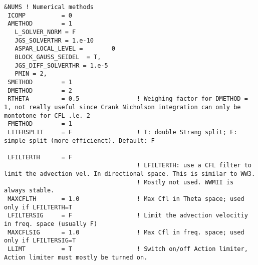 \documentclass[12pt]{amsart}
\begin{document}
\begin{verbatim}
&NUMS ! Numerical methods
 ICOMP          = 0
 AMETHOD        = 1
   L_SOLVER_NORM = F   
   JGS_SOLVERTHR = 1.e-10
   ASPAR_LOCAL_LEVEL =        0
   BLOCK_GAUSS_SEIDEL  = T,
   JGS_DIFF_SOLVERTHR = 1.e-5
   PMIN = 2,
 SMETHOD        = 1
 DMETHOD        = 2
 RTHETA         = 0.5                ! Weighing factor for DMETHOD = 1, not really useful since Crank Nicholson integration can only be montotone for CFL .le. 2
 FMETHOD        = 1
 LITERSPLIT     = F                  ! T: double Strang split; F: simple split (more efficienct). Default: F

 LFILTERTH      = F
                                     ! LFILTERTH: use a CFL filter to limit the advection vel. In directional space. This is similar to WW3.
                                     ! Mostly not used. WWMII is always stable.
 MAXCFLTH       = 1.0                ! Max Cfl in Theta space; used only if LFILTERTH=T
 LFILTERSIG     = F                  ! Limit the advection velocitiy in freq. space (usually F)
 MAXCFLSIG      = 1.0                ! Max Cfl in freq. space; used only if LFILTERSIG=T
 LLIMT          = T                  ! Switch on/off Action limiter, Action limiter must mostly be turned on.


\end{verbatim}
\end{document}
